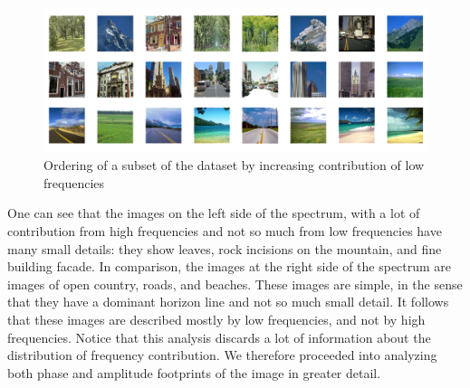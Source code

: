 \documentclass{report}
\begin{document}
\begin{figure}[hbtp]
\centering
\includegraphics[scale=0.3]{graphics/FrequencyOrdered.png}
\caption{Ordering of a subset of the dataset by increasing contribution of low frequencies}
\label{fig:fft_low_freq_order}
\end{figure}
One can see that the images on the left side of the spectrum, with a lot of contribution from high frequencies and not so much from low frequencies have many small details: they show leaves, rock incisions on the mountain, and fine building facade. In comparison, the images at the right side of the spectrum are images of open country, roads, and beaches. These images are simple, in the sense that they have a dominant horizon line and not so much small detail. It follows that these images are described mostly by low frequencies, and not by high frequencies. Notice that this analysis discards a lot of information about the distribution of frequency contribution. We therefore proceeded into analyzing both phase and amplitude footprints of the image in greater detail.
\end{document}
